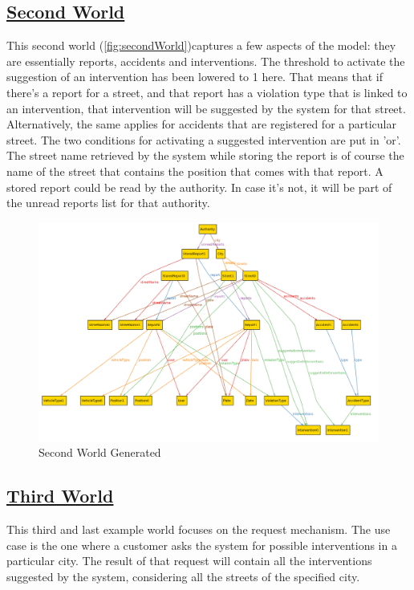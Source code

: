	\subsection[Second World]{\hyperlink{toc}{Second World}}
	This second world (\autoref{fig:secondWorld})captures a few aspects of the model: they are essentially reports, accidents and interventions. The threshold to activate the suggestion of an intervention has been lowered to 1 here. That means that if there's a report for a street, and that report has a violation type that is linked to an intervention, that intervention will be suggested by the system for that street. Alternatively, the same applies for accidents that are registered for a particular street. The two conditions for activating a suggested intervention are put in 'or'.
	The street name retrieved by the system while storing the report is of course the name of the street that contains the position that comes with that report.
	A stored report could be read by the authority. In case it's not, it will be part of the unread reports list for that authority.
	
	\begin{figure}[hbtp]
		\centering
		\includegraphics[scale=0.4, angle=90]{Files/alloy/world2.png}
		\caption{\label{fig:secondWorld}Second World Generated}
	\end{figure}
	
	\FloatBarrier
	\subsection[Third World]{\hyperlink{toc}{Third World}}
	This third and last example world focuses on the request mechanism. The use case is the one where a customer asks the system for possible interventions in a particular city. The result of that request will contain all the interventions suggested by the system, considering all the streets of the specified city.
	
